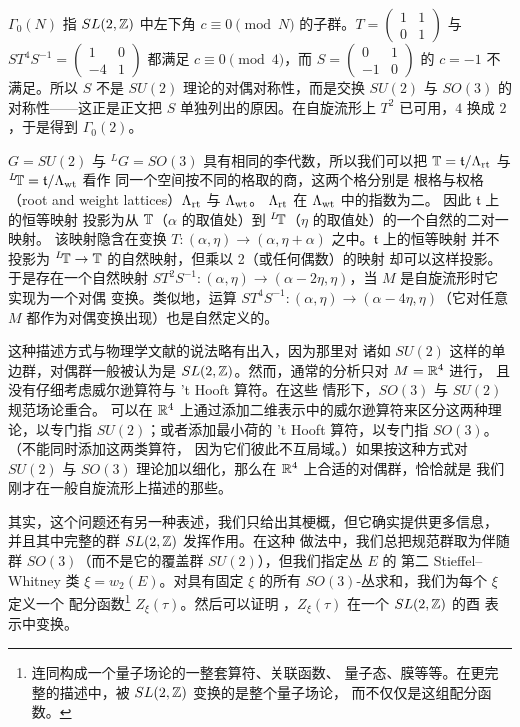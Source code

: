 \begin{yizhu}[易错点]
$\Gamma_0(N)$ 指 $SL(2,{\mathbb{Z}})$ 中左下角 $c\equiv0\pmod N$ 的子群。$T=\left(\begin{smallmatrix}1&1\\0&1\end{smallmatrix}\right)$ 与 $ST^4S^{-1}=\left(\begin{smallmatrix}1&0\\-4&1\end{smallmatrix}\right)$ 都满足 $c\equiv0\pmod4$，而 $S=\left(\begin{smallmatrix}0&1\\-1&0\end{smallmatrix}\right)$ 的 $c=-1$ 不满足。所以 $S$ 不是 $SU(2)$ 理论的对偶对称性，而是交换 $SU(2)$ 与 $SO(3)$ 的对称性——这正是正文把 $S$ 单独列出的原因。在自旋流形上 $T^2$ 已可用，$4$ 换成 $2$，于是得到 $\Gamma_0(2)$。
\end{yizhu}

$G=SU(2)$ 与 $^LG=SO(3)$ 具有相同的李代数，所以我们可以把
${\mathbb{T}}=\mathfrak t/\Lambda_{\rm rt}$ 与 $^L\negthinspace{\mathbb{T}}=\mathfrak t/\Lambda_{\rm wt}$ 看作
同一个空间按不同的格取的商，这两个格分别是
根格与权格（root and weight lattices）$\Lambda_{\rm rt}$ 与 $\Lambda_{\rm wt}$。
$\Lambda_{\rm rt}$ 在 $\Lambda_{\rm wt}$ 中的指数为二。
因此 $\mathfrak t$ 上的恒等映射
投影为从 ${\mathbb{T}}$（$\alpha$ 的取值处）到
$^L\negthinspace{\mathbb{T}}$（$\eta$ 的取值处）的一个自然的二对一映射。
该映射隐含在变换 $T:(\alpha,\eta)\to
(\alpha,\eta+\alpha)$ 之中。$\mathfrak t$ 上的恒等映射
并不投影为 $^L\negthinspace{\mathbb{T}}\to{\mathbb{T}}$ 的自然映射，但乘以 2（或任何偶数）的映射
却可以这样投影。于是存在一个自然映射 $ST^2S^{-1}:(\alpha,\eta)\to
(\alpha-2\eta,\eta)$，当 $M$ 是自旋流形时它实现为一个对偶
变换。类似地，运算
$ST^4S^{-1}:(\alpha,\eta)\to (\alpha-4\eta,\eta)$（它对任意 $M$ 都作为对偶变换出现）也是自然定义的。


这种描述方式与物理学文献的说法略有出入，因为那里对
诸如 $SU(2)$ 这样的单边群，对偶群一般被认为是
$SL(2,{\mathbb{Z}})$。然而，通常的分析只对 $M={\mathbb{R}}^4$ 进行，
且没有仔细考虑威尔逊算符与 't Hooft 算符。在这些
情形下，$SO(3)$ 与 $SU(2)$ 规范场论重合。
可以在 ${\mathbb{R}}^4$ 上通过添加二维表示中的威尔逊算符来区分这两种理论，以专门指
$SU(2)$；或者添加最小荷的 't Hooft 算符，以专门指
$SO(3)$。（不能同时添加这两类算符，
因为它们彼此不互局域。）如果按这种方式对 $SU(2)$ 与 $SO(3)$
理论加以细化，那么在 ${\mathbb{R}}^4$ 上合适的对偶群，恰恰就是
我们刚才在一般自旋流形上描述的那些。


其实，这个问题还有另一种表述，我们只给出其梗概，但它确实提供更多信息，
并且其中完整的群 $SL(2,{\mathbb{Z}})$ 发挥作用。在这种
做法中，我们总把规范群取为伴随群
$SO(3)$（而不是它的覆盖群 $SU(2)$），但我们指定丛 $E$ 的
第二 Stieffel–Whitney 类 $\xi=w_2(E)$。对具有固定 $\xi$ 的所有 $SO(3)$-丛求和，我们为每个 $\xi$ 定义一个
配分函数\footnote{连同构成一个量子场论的一整套算符、关联函数、
量子态、膜等等。在更完整的描述中，被 $SL(2,{\mathbb{Z}})$ 变换的是整个量子场论，
而不仅仅是这组配分函数。} $Z_\xi(\tau)$。然后可以证明
\cite{ref48}，$Z_\xi(\tau)$ 在一个 $SL(2,{\mathbb{Z}})$ 的酉
表示中变换。

